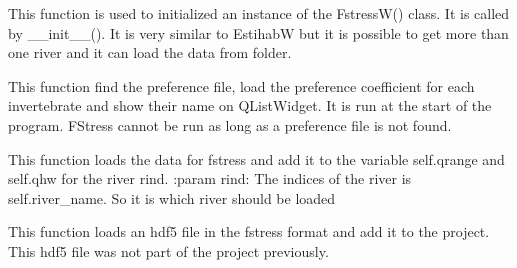 \documentclass[letterpaper,10pt,english]{sphinxmanual}
\begin{document}
\begin{fulllineitems}
\begin{fulllineitems}
\end{fulllineitems}


\begin{fulllineitems}
\label{\detokenize{index:src_GUI.fstress_GUI.FstressW.init_iu}}
This function is used to initialized an instance of the FstressW() class. It is called by \_\_init\_\_().
It is very similar to EstihabW but it is possible to get more than one river and it can load the data from
folder.

\end{fulllineitems}


\begin{fulllineitems}
\label{\detokenize{index:src_GUI.fstress_GUI.FstressW.load_all_fish}}
This function find the preference file, load the preference coefficient for each invertebrate and show their name
on QListWidget. It is run at the start of the program. FStress cannot be run as long as a preference file is not
found.

\end{fulllineitems}


\begin{fulllineitems}
\label{\detokenize{index:src_GUI.fstress_GUI.FstressW.load_data_fstress}}
This function loads the data for fstress and add it to the variable self.qrange and self.qhw for the river
rind.
:param rind: The indices of the river is self.river\_name. So it is which river should be loaded

\end{fulllineitems}


\begin{fulllineitems}
\label{\detokenize{index:src_GUI.fstress_GUI.FstressW.load_hdf5_fstress}}
This function loads an hdf5 file in the fstress format and add it to the project. This hdf5 file was not part of
the project previously.


\end{fulllineitems}
\end{fulllineitems}
\end{document}
